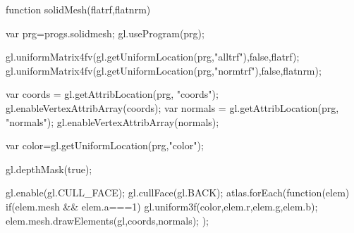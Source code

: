             function solidMesh(flatrf,flatnrm){
                var prg=progs.solidmesh;
                gl.useProgram(prg);
        
                gl.uniformMatrix4fv(gl.getUniformLocation(prg,"alltrf"),false,flatrf);
                gl.uniformMatrix4fv(gl.getUniformLocation(prg,"normtrf"),false,flatnrm);
 
                var coords = gl.getAttribLocation(prg, "coords");
                gl.enableVertexAttribArray(coords);
                var normals = gl.getAttribLocation(prg, "normals");
                gl.enableVertexAttribArray(normals);
                
                var color=gl.getUniformLocation(prg,"color");
                
                gl.depthMask(true);
                
                gl.enable(gl.CULL_FACE);
                gl.cullFace(gl.BACK);
                atlas.forEach(function(elem){
                    if(elem.mesh && elem.a===1){
                        gl.uniform3f(color,elem.r,elem.g,elem.b);
                        elem.mesh.drawElements(gl,coords,normals);
                    }
                });
            }
